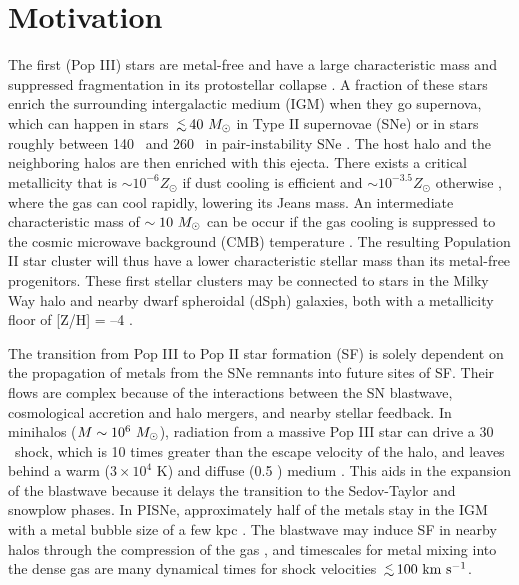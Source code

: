 \documentclass[apjl]{emulateapj}
\newcommand{\kms}{\ifmmode{{\rm km~s^{-1}}}\else{km s$^{-1}$}\fi}
\newcommand{\cubecm}{\ifmmode{{\rm cm^{-3}}}\else{cm$^{-3}$}\fi}
\newcommand{\lsim}{\lower0.3em\hbox{$\,\buildrel <\over\sim\,$}}
\newcommand{\Ms}{\ifmmode{M_\odot}\else{$M_\odot$}\fi}
\begin{document}

\section{Motivation}

The first (Pop III) stars are metal-free and have a large
characteristic mass and suppressed fragmentation in its protostellar
collapse \citep{ABN02, Bromm02_P3, OShea07a}.  A fraction of these
stars enrich the surrounding intergalactic medium (IGM) when they go
supernova, which can happen in stars $\lsim 40~\Ms$ in Type II
supernovae (SNe) or in stars roughly between 140 \Ms~and 260 \Ms~in
pair-instability SNe \citep[PISNe;][]{2002ApJ...567..532H}.  The host
halo and the neighboring halos are then enriched with this ejecta.
There exists a critical metallicity that is $\sim 10^{-6} Z_\odot$ if
dust cooling is efficient \citep{Omukai05, Schneider06_Frag, clark08}
and $\sim 10^{-3.5} Z_\odot$ otherwise \citep{Bromm01,
  2009ApJ...691..441S}, where the gas can cool rapidly, lowering its
Jeans mass.  An intermediate characteristic mass of $\sim10~\Ms$ can
be occur if the gas cooling is suppressed to the cosmic microwave
background (CMB) temperature \citep{Larson98, Tumlinson07_IMF,
  2009ApJ...691..441S}.  The resulting Population II star cluster will
thus have a lower characteristic stellar mass than its metal-free
progenitors.  These first stellar clusters may be connected to stars
in the Milky Way halo and nearby dwarf spheroidal (dSph) galaxies,
both with a metallicity floor of [Z/H] = --4 \citep{Beers05,
  Tafelmeyer10, Frebel10_Obs}.

The transition from Pop III to Pop II star formation (SF) is solely
dependent on the propagation of metals from the SNe remnants into
future sites of SF.  Their flows are complex because of the
interactions between the SN blastwave, cosmological accretion and halo
mergers, and nearby stellar feedback.  In minihalos ($M \sim
10^6~\Ms$), radiation from a massive Pop III star can drive a 30
\kms~shock, which is 10 times greater than the escape velocity of the
halo, and leaves behind a warm ($3 \times 10^4$ K) and diffuse (0.5
\cubecm) medium \citep{Kitayama04, Whalen04, Abel07}.  This aids in the
expansion of the blastwave because it delays the transition to the
Sedov-Taylor and snowplow phases.  In PISNe, approximately half of the
metals stay in the IGM with a metal bubble size of a few kpc
\citep{Wise08_Gal, Greif10}.  The blastwave may induce SF in nearby
halos through the compression of the gas \citep{Ferrara98}, and
timescales for metal mixing into the dense gas are many dynamical
times \citep{Cen08} for shock velocities $\lsim100~\kms$.
\end{document}
